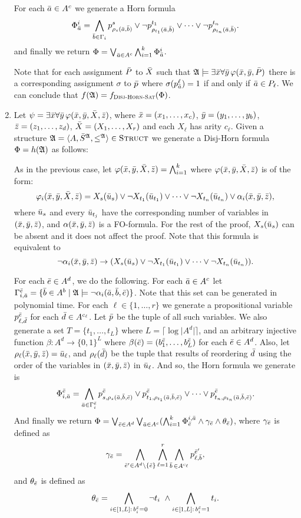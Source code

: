\begin{enumerate}
	For each $\a\in A^c$ we generate a Horn formula
	\[
	\Phi_{\a}^i = \bigwedge_{\b\in\Gamma_i} p^{s}_{\rho_s(\a,\b)} \vee \neg p^{t_1}_{\rho_{t_1}(\a,\b)} \vee \cdots \vee \neg p^{t_n}_{\rho_{t_n}(\a,\b)}.
	\]
	and finally we return $\Phi = \bigvee_{\a\in A^c} \bigwedge_{i = 1}^k \Phi_{\a}^i$.
	
	Note that for each assignment $\P$ to $\X$ such that $\A\models\exists\x\forall\y\,\varphi(\x,\y,\P)$ there is a corresponding assignment $\sigma$ to $\p$ where $\sigma(p^{\ell}_{\a}) = 1$ if and only if $\a\in P_{\ell}$. We can conclude that $f(\A) = f_{\textsc{Disj-Horn-Sat}}(\Phi)$.
	
	\item Let $\psi = \exists \x\forall\y\,\varphi(\x,\y,\X,\z)$, where $\x = (x_1,\ldots,x_c)$, $\y = (y_1,\ldots,y_b)$, $\z = (z_1,\ldots,z_d)$, $\X = (X_1,\ldots,X_r)$ and each $X_{\ell}$ has arity $c_{\ell}$. Given a structure $\A = \langle A, \S^{\A}, \leq^{\A} \rangle\in\str$ we generate a Disj-Horn formula $\Phi = h(\A)$ as follows:
	
	As in the previous case, let $\varphi(\x,\y,\X,\z) = \bigwedge_{i = 1}^k$ where $\varphi(\x,\y,\X,\z)$ is of the form:
	\[
	\varphi_{i}(\x,\y,\X,\z) = X_s(\u_{s}) \vee \neg X_{t_1}(\u_{t_1}) \vee \cdots \vee \neg X_{t_n}(\u_{t_n}) \vee \alpha_i(\x,\y,\z),
	\]
	where $\u_{s}$ and every $\u_{t_j}$ have the corresponding number of variables in $(\x,\y,\z)$, and $\alpha(\x,\y,\z)$ is a FO-formula. For the rest of the proof, $X_s(\u_s)$ can be absent and it does not affect the proof. Note that this formula is equivalent to
	\[
	\neg\alpha_i(\x,\y,\z) \to (X_s(\u_{s}) \vee \neg X_{t_1}(\u_{t_1}) \vee \cdots \vee \neg X_{t_n}(\u_{t_n})).
	\]
	
	For each $\e\in A^d$, we do the following. For each $\a\in A^c$ let $\Gamma^{\e}_{i,\a} = \{\b \in A^b \mid \A\models \neg\alpha_i(\a,\b,\e) \}$. Note that this set can be generated in polynomial time. For each $\ell\in\{1,\ldots,r\}$ we generate a propositional variable $p^{\e}_{\ell,\d}$ for each $\d\in A^{c_{\ell}}$. Let $\p$ be the tuple of all such variables. We also generate a set $T = \{t_1,\ldots,t_{L}\}$ where $L = \lceil \log\vert A^d\vert \rceil$, and an arbitrary injective function $\beta:A^d \to \{0,1\}^L$ where $\beta(\e) = (b^{\e}_1,\ldots,b^{\e}_L)$ for each $\e\in A^d$. Also, let $\rho_{\ell}(\x,\y,\z) = \u_{\ell}$, and $\rho_{\ell}(\d)$ be the tuple that results of reordering $\d$ using the order of the variables in $(\x,\y,\z)$ in $\u_{\ell}$. And so, the Horn formula we generate is
	\[
	\Phi^{\e}_{i,\a} = \bigwedge_{\a\in\Gamma^{\e}_i} p^{\e}_{s,\rho_{s}(\a,\b,\e)} \vee p^{\e}_{t_1,\rho_{t_1}(\a,\b,\e)} \vee \cdots \vee p^{\e}_{t_n,\rho_{t_n}(\a,\b,\e)}.
	\]
	And finally we return $\Phi = \bigvee_{\e\in A^d}\bigvee_{\a\in A^c} (\bigwedge_{i=1}^k \Phi_{\e}^{i,\a} \wedge \gamma_{\e} \wedge \theta_{\e} )$, where $\gamma_{\e}$ is defined as
	\[
	\gamma_{\e} = \bigwedge_{\e'\in A^d\setminus\{\e\}} \bigwedge_{\ell = 1}^r \bigwedge_{\b\,\in A^{c_{\ell}}} p_{\ell,\b}^{\e'},
	\]
	and $\theta_{\e}$ is defined as
	\[
	\theta_{\e} = \bigwedge_{i\in[1,L]:\,b^{\e}_i = 0} \neg t_i\  \wedge \bigwedge_{i\in[1,L]:\,b^{\e}_i = 1} t_i.
	\]
	
\end{enumerate}
